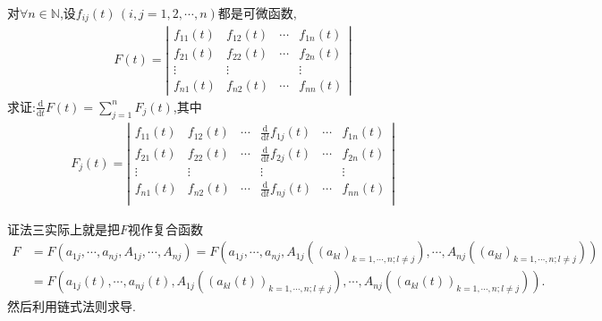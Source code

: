 \documentclass[../../main.tex]{subfiles}%
\begin{document}
\begin{proposition}[行列式的求导运算]\label{proposition:行列式的求导运算}
对$\forall n\in \mathbb{N}$,设\(f_{ij}(t)\,(i,j=1,2,\cdots,n)\)都是可微函数,
\begin{align*}
F(t) = 
\left| \begin{matrix}
f_{11}(t) & f_{12}(t) & \cdots & f_{1n}(t) \\
f_{21}(t) & f_{22}(t) & \cdots & f_{2n}(t) \\
\vdots & \vdots &  & \vdots \\
f_{n1}(t) & f_{n2}(t) & \cdots & f_{nn}(t)
\end{matrix} \right| 
\nonumber
\end{align*}
求证:$\frac{\mathrm{d}}{\mathrm{d}t}F\left( t \right) =\sum_{j=1}^n{F_j\left( t \right)}$,其中
\begin{align*}
F_{j}(t) = 
\left| \begin{matrix}
f_{11}(t)&		f_{12}(t)&		\cdots&		\frac{\mathrm{d}}{\mathrm{d}t}f_{1j}(t)&		\cdots&		f_{1n}(t)\\
f_{21}(t)&		f_{22}(t)&		\cdots&		\frac{\mathrm{d}}{\mathrm{d}t}f_{2j}(t)&		\cdots&		f_{2n}(t)\\
\vdots&		\vdots&		&		\vdots&		&		\vdots\\
f_{n1}(t)&		f_{n2}(t)&		\cdots&		\frac{\mathrm{d}}{\mathrm{d}t}f_{nj}(t)&		\cdots&		f_{nn}(t)\\
\end{matrix} \right| 
\nonumber
\end{align*}
\end{proposition}
\begin{note}
证法三实际上就是把$F$视作复合函数
\begin{align*}
F&=F\left( a_{1j},\cdots ,a_{nj},A_{1j},\cdots ,A_{nj} \right) =F\left( a_{1j},\cdots ,a_{nj},A_{1j}\left( \left( a_{kl} \right) _{k=1,\cdots ,n;l\ne j} \right) ,\cdots ,A_{nj}\left( \left( a_{kl} \right) _{k=1,\cdots ,n;l\ne j} \right) \right) 
\\
&=F\left( a_{1j}\left( t \right) ,\cdots ,a_{nj}\left( t \right) ,A_{1j}\left( \left( a_{kl}\left( t \right) \right) _{k=1,\cdots ,n;l\ne j} \right) ,\cdots ,A_{nj}\left( \left( a_{kl}\left( t \right) \right) _{k=1,\cdots ,n;l\ne j} \right) \right) .
\end{align*}
然后利用链式法则求导.
\end{note}
\end{document}
